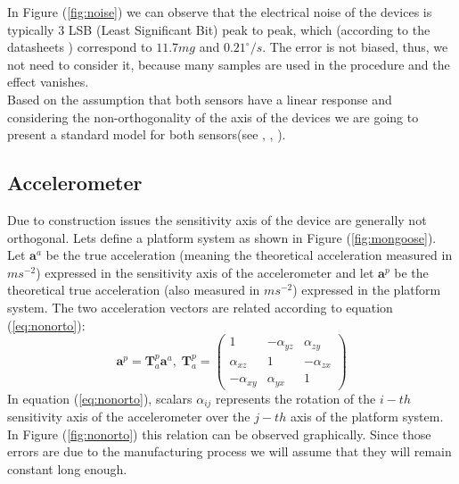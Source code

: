 \documentclass[conference]{IEEEtran}
\newcommand{\refp}[1]{(\ref{#1})}
\begin{document}
In Figure \refp{fig:noise} we can observe that the electrical noise of the devices is typically 3 LSB (Least Significant Bit) peak to peak, which (according to the datasheets \cite{bib:acc_data, bib:gyro_data}) correspond to $11.7 mg$ and $0.21 ^{\circ}/s $. The error is not biased, thus, we not need to consider it, because many samples are used in the procedure and the effect vanishes.\\

Based on the assumption that both sensors have a linear response and considering the non-orthogonality of the axis of the devices we are going to present a standard model for both sensors(see \cite{bib:calib_imu}, \cite{bib:kalman}, \cite{bib:calib_imu_dos}).

\subsection{Accelerometer}
Due to construction issues the sensitivity axis of the device are generally not orthogonal. Lets define a platform system as shown in Figure \refp{fig:mongoose}. Let $\mathbf{a}^a$ be the true acceleration (meaning the theoretical acceleration measured in $ms^{-2}$) expressed in the sensitivity axis of the accelerometer and let $\mathbf{a}^p$ be the theoretical true acceleration (also measured in $ms^{-2}$) expressed in the platform system. The two acceleration vectors are related according to equation \refp{eq:nonorto}:
\begin{equation}
\mathbf{a}^p = \mathbf{T}_a^p\mathbf{a}^a, \; \mathbf{T}_a^p = \left(\begin{array}{ccc}
1 & - \alpha_{yz} & \alpha_{zy}\\
\alpha_{xz} & 1 & - \alpha_{zx}\\
-\alpha_{xy} & \alpha_{yx} & 1
\end{array}\right)
\label{eq:nonorto}
\end{equation}
In equation \refp{eq:nonorto}, scalars $\alpha_{ij}$ represents the rotation of the $i-th$ sensitivity axis of the accelerometer over the $j-th$ axis of the platform system. In Figure \refp{fig:nonorto} this relation can be observed graphically. Since those errors are due to the manufacturing process we will assume that they will remain constant long enough.
\end{document}
